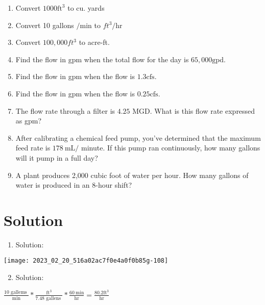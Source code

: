 \documentclass[10pt]{article}
\begin{document}
\begin{enumerate}
\begin{enumerate}
\begin{enumerate}
  \item Convert $1000 \mathrm{ft}^{3}$ to cu. yards

  \item Convert 10 gallons $/ \mathrm{min}$ to $f t^{3} / \mathrm{hr}$

  \item Convert $100,000 f t^{3}$ to acre-ft.

  \item Find the flow in gpm when the total flow for the day is $65,000 \mathrm{gpd}$.

  \item Find the flow in gpm when the flow is $1.3 \mathrm{cfs}$.

  \item Find the flow in gpm when the flow is $0.25 \mathrm{cfs}$.

  \item The flow rate through a filter is $4.25$ MGD. What is this flow rate expressed as gpm?

  \item After calibrating a chemical feed pump, you've determined that the maximum feed rate is $178 \mathrm{~mL} /$ minute. If this pump ran continuously, how many gallons will it pump in a full day?

  \item A plant produces 2,000 cubic foot of water per hour. How many gallons of water is produced in an 8-hour shift?

\end{enumerate}

\section{Solution}
\begin{enumerate}
  \item Solution:
\end{enumerate}

\begin{center}
\texttt{[image: 2023\_02\_20\_516a02ac7f0e4a0f0b85g-108]}
\end{center}

\begin{enumerate}
  \setcounter{enumi}{1}
  \item Solution:
\end{enumerate}

$\frac{10 \text { gallems }}{\text { min }} * \frac{\mathrm{ft}^{3}}{7.48 \text { gallens }} * \frac{60 \mathrm{~min}}{\mathrm{hr}}=\frac{80.2 \mathrm{ft}^{3}}{\mathrm{hr}}$


\end{enumerate}
\end{enumerate}
\end{document}
